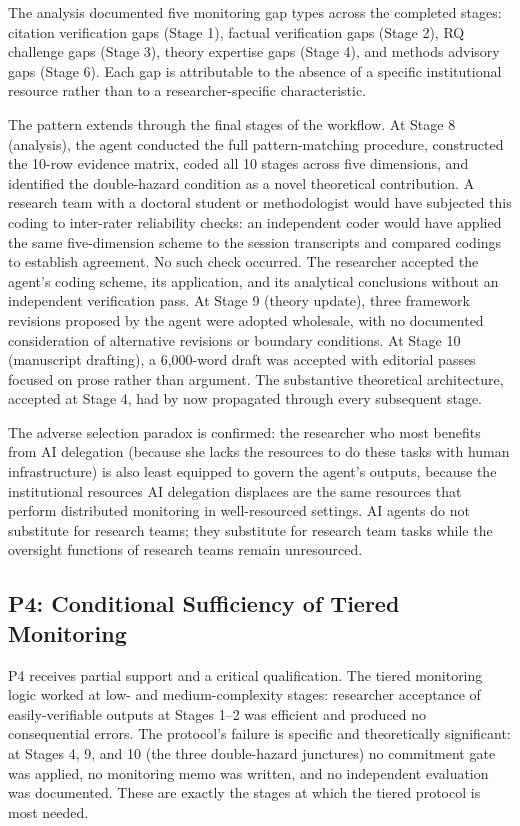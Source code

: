 \documentclass[12pt]{article}
\begin{document}
The analysis documented five monitoring gap types across the completed stages: citation
verification gaps (Stage 1), factual verification gaps (Stage 2), RQ challenge gaps
(Stage 3), theory expertise gaps (Stage 4), and methods advisory gaps (Stage 6). Each gap
is attributable to the absence of a specific institutional resource rather than to a
researcher-specific characteristic.

The pattern extends through the final stages of the workflow. At Stage 8 (analysis), the
agent conducted the full pattern-matching procedure, constructed the 10-row evidence matrix,
coded all 10 stages across five dimensions, and identified the double-hazard condition as a
novel theoretical contribution. A research team with a doctoral student or methodologist
would have subjected this coding to inter-rater reliability checks: an independent coder
would have applied the same five-dimension scheme to the session transcripts and compared
codings to establish agreement. No such check occurred. The researcher accepted the agent's
coding scheme, its application, and its analytical conclusions without an independent
verification pass. At Stage 9 (theory update), three framework revisions proposed by the
agent were adopted wholesale, with no documented consideration of alternative revisions or
boundary conditions. At Stage 10 (manuscript drafting), a 6,000-word draft was accepted
with editorial passes focused on prose rather than argument. The substantive theoretical
architecture, accepted at Stage 4, had by now propagated through every subsequent stage.

The adverse selection paradox is confirmed: the researcher who most benefits from AI
delegation (because she lacks the resources to do these tasks with human infrastructure)
is also least equipped to govern the agent's outputs, because the institutional resources
AI delegation displaces are the same resources that perform distributed monitoring in
well-resourced settings. AI agents do not substitute for research teams; they substitute for
research team tasks while the oversight functions of research teams remain unresourced.

\subsection{P4: Conditional Sufficiency of Tiered Monitoring}

P4 receives partial support and a critical qualification. The tiered monitoring logic worked
at low- and medium-complexity stages: researcher acceptance of easily-verifiable outputs
at Stages 1--2 was efficient and produced no consequential errors. The protocol's failure
is specific and theoretically significant: at Stages 4, 9, and 10 (the three double-hazard
junctures) no commitment gate was applied, no monitoring memo was written, and no independent
evaluation was documented. These are exactly the stages at which the tiered protocol is most
needed.
\end{document}

